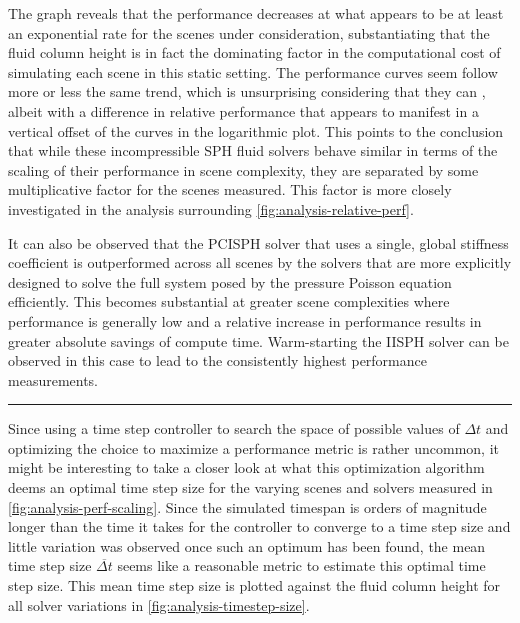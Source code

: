 \documentclass[oneside, a4paper]{book}
\newcommand\horizontalspacer[0]{\vspace{5pt}\noindent\textcolor{lightgray}{\rule{\textwidth}{1mm}}
\vspace{5pt}}
\begin{document}
  

  The graph reveals that the performance decreases at what appears to be at least an exponential rate for the scenes under consideration, substantiating that the fluid column height is in fact the dominating factor in the computational cost of simulating each scene in this static setting. The performance curves seem follow more or less the same trend, which is unsurprising considering that they can \autocite[all be shown to be functionally equivalent to some degree]{2022-survey-equographics-star}, albeit with a difference in relative performance that appears to manifest in a vertical offset of the curves in the logarithmic plot. This points to the conclusion that while these incompressible SPH fluid solvers behave similar in terms of the scaling of their performance in scene complexity, they are separated by some multiplicative factor for the scenes measured. This factor is more closely investigated in the analysis surrounding \autoref{fig:analysis-relative-perf}. 
  
  It can also be observed that the PCISPH solver that uses a single, global stiffness coefficient is outperformed across all scenes by the solvers that are more explicitly designed to solve the full system posed by the pressure Poisson equation efficiently. This becomes substantial at greater scene complexities where performance is generally low and a relative increase in performance results in greater absolute savings of compute time. Warm-starting the IISPH solver can be observed in this case to lead to the consistently highest performance measurements.

  \horizontalspacer

  Since using a time step controller to search the space of possible values of $\Delta t$ and optimizing the choice to maximize a performance metric is rather uncommon, it might be interesting to take a closer look at what this optimization algorithm deems an optimal time step size for the varying scenes and solvers measured in \autoref{fig:analysis-perf-scaling}. Since the simulated timespan is orders of magnitude longer than the time it takes for the controller to converge to a time step size and little variation was observed once such an optimum has been found, the mean time step size $\overline{\Delta t}$ seems like a reasonable metric to estimate this optimal time step size. This mean time step size is plotted against the fluid column height for all solver variations in \autoref{fig:analysis-timestep-size}. 
  
\end{document}
